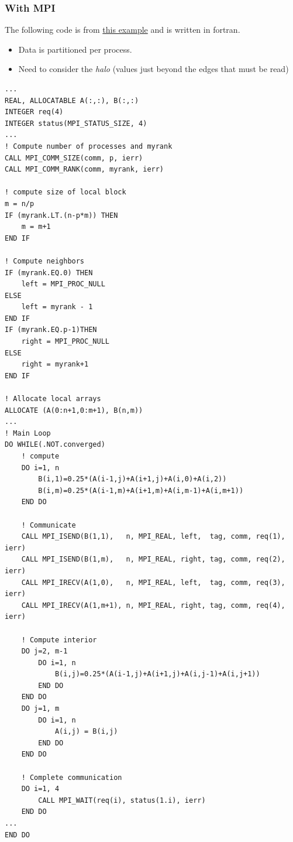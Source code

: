 \subsubsection{With MPI}
The following code is from \href{https://netlib.org/utk/papers/mpi-book/node51.html}{this example} and is written in fortran.
\begin{itemize}
	\item Data is partitioned per process.
	\item Need to consider the \textit{halo} (values just beyond the edges that must be read)
\end{itemize}
\begin{verbatim}
...
REAL, ALLOCATABLE A(:,:), B(:,:)
INTEGER req(4)
INTEGER status(MPI_STATUS_SIZE, 4)
...
! Compute number of processes and myrank
CALL MPI_COMM_SIZE(comm, p, ierr)
CALL MPI_COMM_RANK(comm, myrank, ierr)

! compute size of local block
m = n/p
IF (myrank.LT.(n-p*m)) THEN
    m = m+1
END IF

! Compute neighbors
IF (myrank.EQ.0) THEN
    left = MPI_PROC_NULL
ELSE
    left = myrank - 1
END IF
IF (myrank.EQ.p-1)THEN
    right = MPI_PROC_NULL
ELSE
    right = myrank+1
END IF

! Allocate local arrays
ALLOCATE (A(0:n+1,0:m+1), B(n,m))
...
! Main Loop
DO WHILE(.NOT.converged)
    ! compute
    DO i=1, n
        B(i,1)=0.25*(A(i-1,j)+A(i+1,j)+A(i,0)+A(i,2))
        B(i,m)=0.25*(A(i-1,m)+A(i+1,m)+A(i,m-1)+A(i,m+1))
    END DO

    ! Communicate
    CALL MPI_ISEND(B(1,1),   n, MPI_REAL, left,  tag, comm, req(1), ierr)
    CALL MPI_ISEND(B(1,m),   n, MPI_REAL, right, tag, comm, req(2), ierr)
    CALL MPI_IRECV(A(1,0),   n, MPI_REAL, left,  tag, comm, req(3), ierr)
    CALL MPI_IRECV(A(1,m+1), n, MPI_REAL, right, tag, comm, req(4), ierr)

    ! Compute interior
    DO j=2, m-1
        DO i=1, n
            B(i,j)=0.25*(A(i-1,j)+A(i+1,j)+A(i,j-1)+A(i,j+1))
        END DO
    END DO
    DO j=1, m
        DO i=1, n
            A(i,j) = B(i,j)
        END DO
    END DO

    ! Complete communication
    DO i=1, 4
        CALL MPI_WAIT(req(i), status(1.i), ierr)
    END DO
...
END DO
\end{verbatim}

